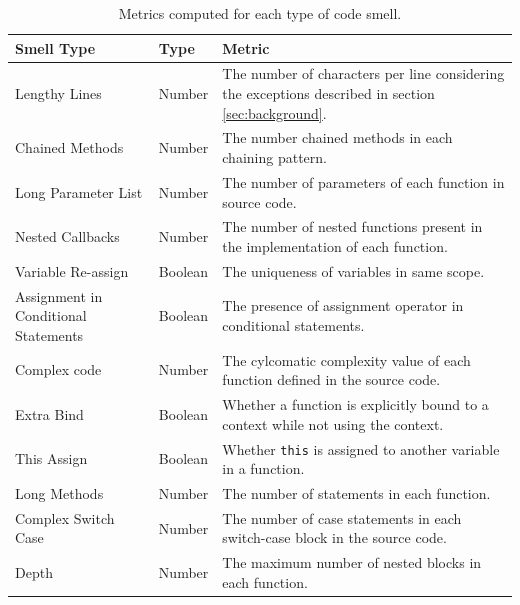 \begin{table}[!htbp]
\scriptsize
\centering
\caption{Metrics computed for each type of code smell.}
\label{smellmetric}
\begin{tabular}{l|l|m{5cm}}
\hline
Smell Type                           & Type    & Metric                                                                                                  \\ \hline
Lengthy Lines                        & Number  & The number of characters per line considering the exceptions described in section \ref{sec:background}. \\ \hline
Chained Methods                      & Number  & The number chained methods in each chaining pattern.                                               \\ \hline
Long Parameter List                  & Number  & The number of parameters of each function in source code.                                               \\ \hline
Nested Callbacks                     & Number  & The number of nested functions present in the implementation of each function.                          \\ \hline
Variable Re-assign                   & Boolean & The uniqueness of variables in same scope.                                                              \\ \hline
Assignment in Conditional Statements & Boolean & The presence of assignment operator in conditional statements.                                          \\ \hline
Complex code                         & Number  & The cylcomatic complexity value of each function defined in the source code.                            \\ \hline
Extra Bind                           & Boolean & Whether a function is explicitly bound to a context while not using the context.                        \\ \hline
This Assign                          & Boolean & Whether \texttt{this} is assigned to another variable in a function.                                    \\ \hline
Long Methods                         & Number  & The number of statements in each function.                                                              \\ \hline
Complex Switch Case                  & Number  & The number of case statements in each switch-case block in the source code.                             \\ \hline
Depth                                & Number  & The maximum number of nested blocks in each function.                                                   \\ \hline
\end{tabular}
\vspace{-15pt}
\end{table}

